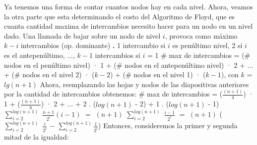 \documentclass[10pt,a4paper]{article}
\begin{document}
\newline
\newline
Ya tenemos una forma de contar cuantos nodos hay en cada nivel. Ahora, veamos la otra parte que esta determinando el costo del Algoritmo de Floyd, que es cuanta cantidad maxima de intercambios necesito hacer para un nodo en un nivel dado. 
\newline
\newline
Una llamada de bajar sobre un nodo de nivel $i$, provoca como máximo $k - i$ intercambios (op. dominante) 
\newline
\newline
\textbf{.} 1 intercambio si $i$ es penúltimo nivel, 2 si $i$ es el antepenúltimo, ..., $k-1$ intercambios si $i$ = 1
\newline
\newline
\# max de intercambios = 
\newline
\newline
(\# nodos en el penúltimo nivel) · 1 + (\# nodos en el antepenúltimo nivel) · 2 + ... + (\# nodos en el nivel 2) · ($k-2$) + 
\newline
\newline
(\# nodos en el nivel 1) · ($k-1$), con $k$ = $lg(n+1)$
\newline
\newline
\newline
\newline
Ahora, reemplazando las hojas y nodos de las diapositivas anteriores por la cantidad de intercambios obtenemos:
\newline
\newline
\# max de intercambios = 
\newline
\newline
($\displaystyle \frac{(n+1)}{4}$) · 1 + ($\displaystyle \frac{(n+1)}{8}$) · 2 + ... + 2 . ($log(n+1)$ - 2) + 1 . ($log(n+1)$ - 1) 
\newline
\newline
\newline
$\displaystyle \sum_{i=2}^{log(n+1)}$ $\displaystyle \frac{n+1}{2^{i}}(i-1)$ $=$ $(n+1)$ $\displaystyle \sum_{i=2}^{log(n+1)}$ $\displaystyle \frac{i-1}{2^{i}}$ $=$ $(n+1)$ ($\displaystyle \sum_{i=2}^{log(n+1)}$ $\displaystyle \frac{i}{2^{i}}$ $-$ $\displaystyle \sum_{i=2}^{log(n+1)} \displaystyle \frac{1}{2^{i}}$) 
\newline
\newline
\newline
Entonces, consideremos la primer y segunda mitad de la igualdad:
\newline
\end{document}
